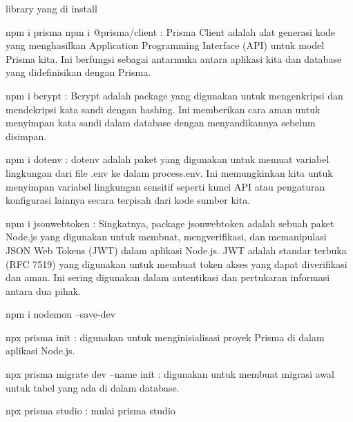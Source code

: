 library yang di install

npm i prisma 
npm i @prisma/client :
Prisma Client adalah alat generasi kode yang menghasilkan Application Programming Interface (API) 
untuk model Prisma kita. Ini berfungsi sebagai antarmuka antara aplikasi kita dan database yang didefinisikan dengan Prisma.

npm i bcrypt :
Bcrypt adalah package yang digunakan untuk mengenkripsi dan mendekripsi kata sandi dengan hashing.
 Ini memberikan cara aman untuk menyimpan kata sandi dalam database dengan menyandikannya sebelum disimpan.
 
 npm i dotenv :
 dotenv adalah paket yang digunakan untuk memuat variabel lingkungan dari file .env ke dalam process.env.
Ini memungkinkan kita untuk menyimpan variabel lingkungan sensitif seperti kunci API atau pengaturan konfigurasi lainnya secara terpisah dari kode sumber kita.

npm i jsonwebtoken :
Singkatnya, package jsonwebtoken adalah sebuah paket Node.js yang digunakan untuk membuat, mengverifikasi, dan memanipulasi JSON Web Tokens (JWT) dalam aplikasi 
Node.js. JWT adalah standar terbuka (RFC 7519) yang digunakan untuk membuat token akses yang dapat diverifikasi dan aman.
 Ini sering digunakan dalam autentikasi dan pertukaran informasi antara dua pihak.

 npm i nodemon --save-dev

 npx prisma init : digunakan untuk menginisialisasi proyek Prisma di dalam aplikasi Node.js.

 npx prisma migrate dev --name init :
 digunakan untuk membuat migrasi awal untuk tabel yang ada di dalam database.

 npx prisma studio : mulai prisma studio